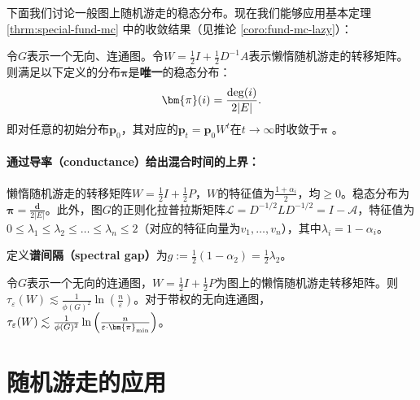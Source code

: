 下面我们讨论一般图上随机游走的稳态分布。现在我们能够应用基本定理 \ref{thrm:special-fund-mc} 中的收敛结果（见推论 \ref{coro:fund-mc-lazy}）：

\begin{corollary}
    \label{coro:fund-mc-lazy}
    令$G$表示一个无向、连通图。令$W=\frac{1}{2}I+\frac{1}{2}D^{-1}A$表示懒惰随机游走的转移矩阵。则满足以下定义的分布$\bm{\pi}$是\textbf{唯一}的稳态分布：
    \[
        \bm{\pi}(i)=\frac{\textup{deg}(i)}{2|E|}.
    \]
    即对任意的初始分布$\bm{p}_0$，其对应的$\bm{p}_t=\bm{p}_0W^t$在$t\to \infty$时收敛于$\bm{\pi}$%
    。
\end{corollary}

\paragraph{通过导率（conductance）给出混合时间的上界：}
                
                懒惰随机游走的转移矩阵$W=\frac{1}{2}I+\frac{1}{2}P$，$W$的特征值为$\frac{1+\alpha_i}{2}$，均$\ge 0$。稳态分布为$\bm{\pi}=\frac{\bm{d}}{2|E|}$。此外，图$G$的正则化拉普拉斯矩阵$\mathcal{L}=D^{-1/2}LD^{-1/2}=I-\mathcal{A}$，特征值为$0\le\lambda_1\le \lambda_2\le\dots\le \lambda_n\le 2$（对应的特征向量为$v_1,\dots,v_n$），其中$\lambda_i=1-\alpha_i$。

                定义\textbf{谱间隔（spectral gap）}为$g:=\frac{1}{2}(1-\alpha_2)=\frac{1}{2}\lambda_2$。

                \begin{theorem}
                    \label{thrm:mixing-time-g-c}
                    令$G$表示一个无向的连通图，$W=\frac{1}{2}I+\frac{1}{2}P$为图上的懒惰随机游走转移矩阵。则$\tau_{\varepsilon}(W)\lesssim\frac{1}{\phi(G)^2}\ln{\left(\frac{n}{\varepsilon}\right)}$。对于带权的无向连通图，$\tau_{\varepsilon}(W)\lesssim\frac{1}{\phi(G)^2}\ln{\left(\frac{n}{\varepsilon\cdot \bm{\pi}_{\textup{min}}}\right)}$。
                \end{theorem}
            
            
        
\section{随机游走的应用}

